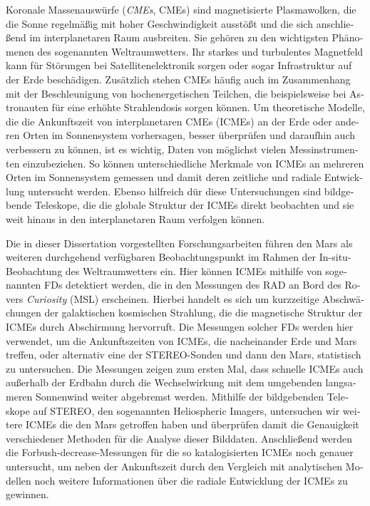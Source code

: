 \begin{otherlanguage}{ngerman}
Koronale Massenauswürfe (\textit{\aclp{CME}}, \acp{CME}) sind magnetisierte Plasmawolken, die die Sonne regelmäßig mit hoher Geschwindigkeit ausstößt und die sich anschließend im interplanetaren Raum ausbreiten. Sie gehören zu den wichtigsten Phänomenen des sogenannten Weltraumwetters.
Ihr starkes und turbulentes Magnetfeld kann für Störungen bei Satellitenelektronik sorgen oder sogar Infrastruktur auf der Erde beschädigen. Zusätzlich stehen \acp{CME} häufig auch im Zusammenhang mit der Beschleunigung von hochenergetischen Teilchen, die beispielsweise bei Astronauten für eine erhöhte Strahlendosis sorgen können.
Um theoretische Modelle, die die Ankunftszeit von interplanetaren \acp{CME} (\acsp{ICME}) an der Erde oder anderen Orten im Sonnensystem vorhersagen, besser überprüfen und daraufhin auch verbessern zu können, ist es wichtig, Daten von möglichst vielen Messinstrumenten einzubeziehen. So können unterschiedliche Merkmale von \acp{ICME} an mehreren Orten im Sonnensystem gemessen und damit deren zeitliche und radiale Entwicklung untersucht werden. Ebenso hilfreich dür diese Untersuchungen sind bildgebende Teleskope, die die globale Struktur der \acp{ICME} direkt beobachten und sie weit hinaus in den interplanetaren Raum verfolgen können.

Die in dieser Dissertation vorgestellten Forschungsarbeiten führen den Mars als weiteren durchgehend verfügbaren Beobachtungspunkt im Rahmen der In-situ-Beobachtung des Weltraumwetters ein. Hier können \acp{ICME} mithilfe von sogenannten \aclp{FD} detektiert werden, die in den Messungen des \ac{RAD} an Bord des Rovers \textit{Curiosity} (\acl{MSL}) erscheinen. Hierbei handelt es sich um kurzzeitige Abschwächungen der galaktischen kosmischen Strahlung, die die magnetische Struktur der \acp{ICME} durch Abschirmung hervorruft.
Die Messungen solcher \aclp{FD} werden hier verwendet, um die Ankunftszeiten von \acp{ICME}, die nacheinander Erde und Mars treffen, oder alternativ eine der \acs{STEREO}-Sonden und dann den Mars, statistisch zu untersuchen. %
Die Messungen zeigen zum ersten Mal, dass schnelle \acp{ICME} auch außerhalb der Erdbahn durch die Wechselwirkung mit dem umgebenden langsameren Sonnenwind weiter abgebremst werden.
Mithilfe der bildgebenden Teleskope auf \acs{STEREO}, den sogenannten Heliospheric Imagers, untersuchen wir weitere \acp{ICME} die den Mars getroffen haben und überprüfen damit die Genauigkeit verschiedener Methoden für die Analyse dieser Bilddaten.
Anschließend werden die Forbush-decrease-Messungen für die so katalogisierten \acp{ICME} noch genauer untersucht, um neben der Ankunftszeit durch den Vergleich mit analytischen Modellen noch weitere Informationen über die radiale Entwicklung der \acp{ICME} zu gewinnen.


\end{otherlanguage}
